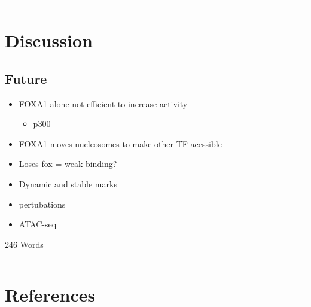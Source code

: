 \documentclass[
  11pt,
]{article}
\providecommand{\tightlist}{%
  \setlength{\itemsep}{0pt}\setlength{\parskip}{0pt}}
\begin{document}
\begin{center}\rule{0.5\linewidth}{0.5pt}\end{center}

\hypertarget{discussion}{%
\section{Discussion}\label{discussion}}

\hypertarget{future}{%
\subsection{Future}\label{future}}

\begin{itemize}
\item
  FOXA1 alone not efficient to increase activity

  \begin{itemize}
  \tightlist
  \item
    p300
  \end{itemize}
\item
  FOXA1 moves nucleosomes to make other TF acessible
\item
  Loses fox = weak binding?
\item
  Dynamic and stable marks
\item
  pertubations
\end{itemize}

\begin{itemize}
\tightlist
\item
  ATAC-seq
\end{itemize}

\begin{flushright}
246 Words
\end{flushright}

\begin{center}\rule{0.5\linewidth}{0.5pt}\end{center}

\hypertarget{references}{%
\section*{References}\label{references}}
\end{document}
